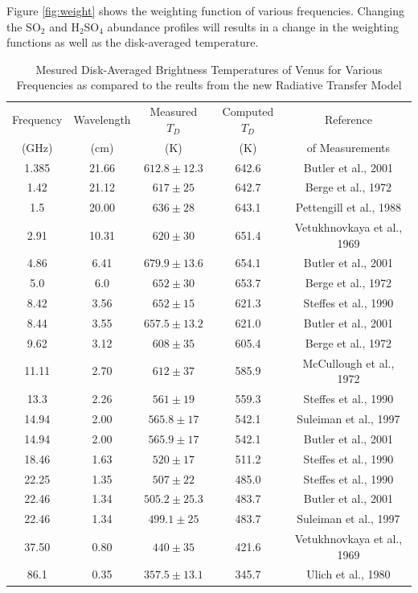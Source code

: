 Figure \ref{fig:weight} shows the weighting function of various frequencies. Changing the SO$_2$ and H$_2$SO$_4$ abundance profiles will results in a change in the weighting functions as well as the disk-averaged temperature.
\begin{table}[h]
 \centering 
\caption{Mesured Disk-Averaged Brightness Temperatures of Venus for Various Frequencies as compared to the reults from the new Radiative Transfer Model}
\begin{tabular}{||c|c|c|c|c||}
\hline
Frequency & Wavelength & Measured $T_D$ & Computed $T_D$ & Reference\\
(GHz) & (cm) &(K)&(K)& of Measurements\\
\hline
1.385 	& 21.66	 	&$612.8 \pm 12.3$	&642.6  &Butler et al., 2001 			\cite{Butler-2001}\\
1.42 	& 21.12 	&$617 	\pm 25$		&642.7  &Berge et al., 1972 			\cite{Berge-1972}\\
1.5 	& 20.00 	&$636 	\pm 28$		&643.1  &Pettengill et al., 1988 		\cite{Pettengill-1988}\\
2.91 	& 10.31 	&$620 	\pm 30$		&651.4  &Vetukhnovkaya et al., 1969 	\cite{Vetukhnovkaya-1969}\\
4.86 	& 6.41	 	&$679.9 \pm 13.6$	&654.1  &Butler et al., 2001 			\cite{Butler-2001}\\
5.0 	& 6.0 		&$652 	\pm 30$		&653.7  &Berge et al., 1972 			\cite{Berge-1972}\\
8.42 	& 3.56	 	&$652 	\pm 15$		&621.3  &Steffes et al., 1990 			\cite{Steffes-1990}\\
8.44 	& 3.55	 	&$657.5 \pm 13.2$	&621.0  &Butler et al., 2001 			\cite{Butler-2001}\\
9.62 	& 3.12	 	&$608 	\pm 35$		&605.4  &Berge et al., 1972 			\cite{Berge-1972}\\
11.11 	& 2.70	 	&$612 	\pm 37$		&585.9  &McCullough et al., 1972 		\cite{McCullough-1972}\\
13.3	& 2.26	 	&$561 	\pm 19$		&559.3  &Steffes et al., 1990			\cite{Steffes-1990}\\
14.94 	& 2.00	 	&$565.8 \pm 17$		&542.1  &Suleiman et al., 1997 			\cite{Suleiman-thesis}\\
14.94 	& 2.00	 	&$565.9 \pm 17$		&542.1  &Butler et al., 2001 			\cite{Butler-2001}\\
18.46 	& 1.63	 	&$520 	\pm 17$		&511.2  &Steffes et al., 1990			\cite{Steffes-1990}\\
22.25 	& 1.35	 	&$507 	\pm 22$		&485.0  &Steffes et al., 1990			\cite{Steffes-1990}\\
22.46 	& 1.34	 	&$505.2 \pm 25.3$	&483.7  &Butler et al., 2001 			\cite{Butler-2001}\\
22.46 	& 1.34	 	&$499.1 \pm 25$		&483.7  &Suleiman et al., 1997 			\cite{Suleiman-thesis}\\
37.50 	& 0.80	 	&$440 	\pm 35$		&421.6  &Vetukhnovkaya et al., 1969 	\cite{Vetukhnovkaya-1969}\\
86.1 	& 0.35	 	&$357.5	\pm 13.1$	&345.7  &Ulich et al., 1980 			\cite{Ulich-1980}\\
\hline
\end{tabular}
\label{tab:rtm-results}
\end{table}

